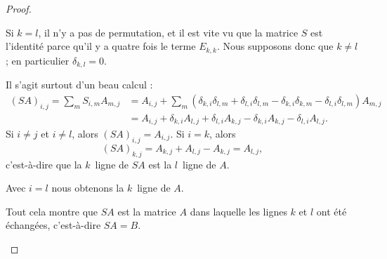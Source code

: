 \begin{proof}
\begin{subproof}
		\spitem[\ref{ITEMooDNHWooOMgmxa}]
		Si \( k=l\), il n'y a pas de permutation, et il est vite vu que la matrice \( S\) est l'identité parce qu'il y a quatre fois le terme \( E_{k,k}\). Nous supposons donc que \( k\neq l\); en particulier \( \delta_{k,l}=0\).

		Il s'agit surtout d'un beau calcul :
		\begin{subequations}
			\begin{align}
				(SA)_{i,j}=\sum_{m}S_{i,m}A_{m,j} & =A_{i,j}+\sum_m(\delta_{k,i}\delta_{l,m}+\delta_{l,i}\delta_{l,m}-\delta_{k,i}\delta_{k,m}-\delta_{l,i}\delta_{l,m})A_{m,j}     \\
				                                  & =A_{i,j}+\delta_{k,i}A_{l,j}+\delta_{l,i}A_{k,j}-\delta_{k,i}A_{k,j}-\delta_{l,i}A_{l,j}.
			\end{align}
		\end{subequations}
		Si \( i\neq j\) et \( i\neq l\), alors \( (SA)_{i,j}=A_{i,j}\). Si \( i=k\), alors
		\begin{equation}
			(SA)_{k,j}=A_{k,j}+A_{l,j}-A_{k,j}=A_{l,j},
		\end{equation}
		c'est-à-dire que la \( k\)\ieme\ ligne de \( SA\) est la \( l\)\ieme\ ligne de \( A\).

		Avec \( i=l\) nous obtenons la \( k\)\ieme\ ligne de \( A\).

		Tout cela montre que \( SA\) est la matrice \( A\) dans laquelle les lignes \( k\) et \( l\) ont été échangées, c'est-à-dire \( SA=B\).


\end{subproof}
\end{proof}
